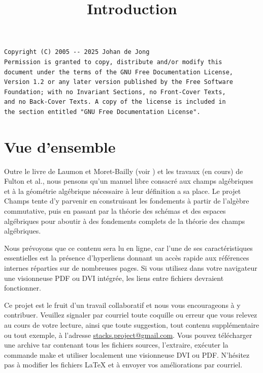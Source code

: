 

%


\title{Introduction}


\maketitle

\label{section-phantom}

\begin{verbatim}
Copyright (C) 2005 -- 2025 Johan de Jong
Permission is granted to copy, distribute and/or modify this
document under the terms of the GNU Free Documentation License,
Version 1.2 or any later version published by the Free Software
Foundation; with no Invariant Sections, no Front-Cover Texts,
and no Back-Cover Texts. A copy of the license is included in
the section entitled "GNU Free Documentation License".
\end{verbatim}

\tableofcontents


\section{Vue d'ensemble}
\label{section-overview}

\noindent
Outre le livre de Laumon et Moret-Bailly (voir \cite{LM-B}) et les travaux
(en cours) de Fulton et al., nous pensons qu'un manuel libre consacr\'e aux
champs alg\'ebriques et \`a la g\'eom\'etrie alg\'ebrique n\'ecessaire \`a leur
d\'efinition a sa place. Le projet Champs tente d'y parvenir en construisant les
fondements \`a partir de l'alg\`ebre commutative, puis en passant par la
th\'eorie des sch\'emas et des espaces alg\'ebriques pour aboutir \`a des
fondements complets de la th\'eorie des champs alg\'ebriques.

\medskip\noindent
Nous pr\'evoyons que ce contenu sera lu en ligne, car l'une de ses
caract\'eristiques essentielles est la pr\'esence d'hyperliens donnant un
acc\`es rapide aux r\'ef\'erences internes r\'eparties sur de nombreuses pages.
Si vous utilisez dans votre navigateur une visionneuse PDF ou DVI int\'egr\'ee,
les liens entre fichiers devraient fonctionner.

\medskip\noindent
Ce projet est le fruit d'un travail collaboratif et nous vous encourageons
\`a y contribuer. Veuillez signaler par courriel toute coquille ou erreur
que vous relevez au cours de votre lecture, ainsi que toute suggestion,
tout contenu suppl\'ementaire ou tout exemple, \`a l'adresse
\href{mailto:stacks.project@gmail.com}{stacks.project@gmail.com}.
Vous pouvez t\'el\'echarger une archive tar contenant tous les fichiers sources,
l'extraire, ex\'ecuter la commande make et utiliser localement une visionneuse DVI ou PDF.
N'h\'esitez pas \`a modifier les fichiers LaTeX et \`a envoyer vos am\'eliorations
par courriel.


